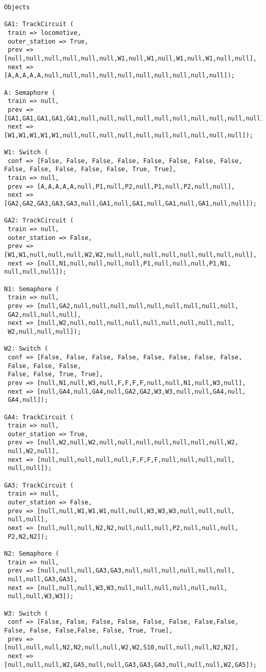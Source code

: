 \begin{lstlisting}[caption={oggetti istanziati nella simulazione}]
Objects

GA1: TrackCircuit (
 train => locomotive, 
 outer_station => True,
 prev => [null,null,null,null,null,null,W1,null,W1,null,W1,null,W1,null,null],
 next => [A,A,A,A,A,null,null,null,null,null,null,null,null,null,null]);

A: Semaphore (
 train => null,
 prev => [GA1,GA1,GA1,GA1,GA1,null,null,null,null,null,null,null,null,null,null],
 next => [W1,W1,W1,W1,W1,null,null,null,null,null,null,null,null,null,null]);

W1: Switch (
 conf => [False, False, False, False, False, False, False, False, False, False, False, False, False, True, True],
 train => null,
 prev => [A,A,A,A,A,null,P1,null,P2,null,P1,null,P2,null,null],
 next => [GA2,GA2,GA3,GA3,GA3,null,GA1,null,GA1,null,GA1,null,GA1,null,null]);
 
GA2: TrackCircuit (
 train => null, 
 outer_station => False,
 prev => [W1,W1,null,null,null,W2,W2,null,null,null,null,null,null,null,null],
 next => [null,N1,null,null,null,null,P1,null,null,null,P1,N1, null,null,null]);
 
N1: Semaphore (
 train => null,
 prev => [null,GA2,null,null,null,null,null,null,null,null,null,
 GA2,null,null,null],
 next => [null,W2,null,null,null,null,null,null,null,null,null,
 W2,null,null,null]);
 
W2: Switch (
 conf => [False, False, False, False, False, False, False, False, 
 False, False, False, 
 False, False, True, True],
 prev => [null,N1,null,W3,null,F,F,F,F,null,null,N1,null,W3,null],
 next => [null,GA4,null,GA4,null,GA2,GA2,W3,W3,null,null,GA4,null,
 GA4,null]);

GA4: TrackCircuit (
 train => null, 
 outer_station => True,
 prev => [null,W2,null,W2,null,null,null,null,null,null,null,W2,
 null,W2,null],
 next => [null,null,null,null,null,F,F,F,F,null,null,null,null,
 null,null]);

GA3: TrackCircuit (
 train => null, 
 outer_station => False,
 prev => [null,null,W1,W1,W1,null,null,W3,W3,W3,null,null,null,
 null,null],
 next => [null,null,null,N2,N2,null,null,null,P2,null,null,null,
 P2,N2,N2]);

N2: Semaphore (
 train => null,
 prev => [null,null,null,GA3,GA3,null,null,null,null,null,null,
 null,null,GA3,GA3],
 next => [null,null,null,W3,W3,null,null,null,null,null,null,
 null,null,W3,W3]);

W3: Switch (
 conf => [False, False, False, False, False, False, False,False, False, False, False,False, False, True, True],
 prev => [null,null,null,N2,N2,null,null,W2,W2,S10,null,null,null,N2,N2],
 next => [null,null,null,W2,GA5,null,null,GA3,GA3,GA3,null,null,null,W2,GA5]);


\end{lstlisting}
